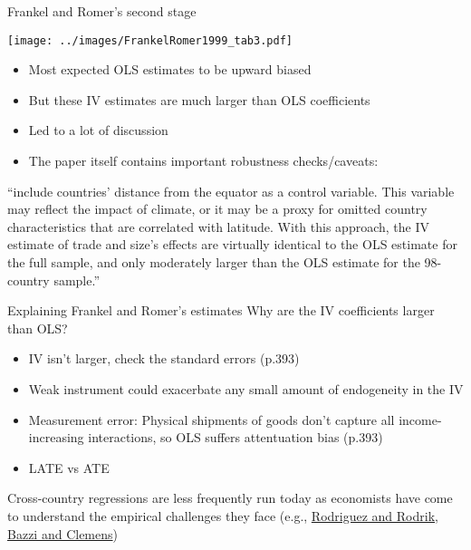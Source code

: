 \documentclass[10pt,notes=hide]{beamer}
\begin{document}
\begin{frame}{Frankel and Romer's second stage}
\begin{minipage}{0.49\textwidth}
\texttt{[image: ../images/FrankelRomer1999\_tab3.pdf]}
\end{minipage}
\begin{minipage}{0.49\textwidth}
\begin{itemize}
	\item Most expected OLS estimates to be upward biased
	\item But these IV estimates are much larger than OLS coefficients
	\item Led to a lot of discussion
	\item The paper itself contains important robustness checks/caveats:
\end{itemize}
\end{minipage}
{\footnotesize ``include countries' distance from the equator as a control variable. This variable may reflect the impact of climate, or it may be a proxy for omitted country characteristics that are correlated with latitude. With this approach, the IV estimate of trade and size’s effects are virtually identical to the OLS estimate for the full sample, and only moderately larger than the OLS estimate for the 98-country sample.''\par}
\end{frame}
\begin{frame}{Explaining Frankel and Romer's estimates}
Why are the IV coefficients larger than OLS?
\begin{itemize}
	\item IV isn't larger, check the standard errors (p.393)
	\item Weak instrument could exacerbate any small amount of endogeneity in the IV
	\item Measurement error: Physical shipments of goods don't capture all income-increasing interactions, so OLS suffers attentuation bias (p.393)
	\item LATE vs ATE
\end{itemize}
Cross-country regressions are less frequently run today as economists have come to understand the empirical challenges they face (e.g., \href{https://www.journals.uchicago.edu/doi/abs/10.1086/654419}{Rodriguez and Rodrik}, \href{https://www.jstor.org/stable/43189545}{Bazzi and Clemens})
\end{frame}
\end{document}
